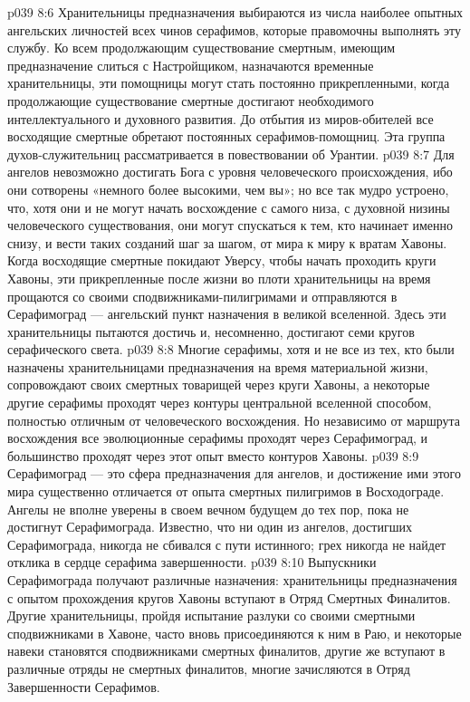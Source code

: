 \vs p039 8:6 Хранительницы предназначения выбираются из числа наиболее опытных ангельских личностей всех чинов серафимов, которые правомочны выполнять эту службу. Ко всем продолжающим существование смертным, имеющим предназначение слиться с Настройщиком, назначаются временные хранительницы, эти помощницы могут стать постоянно прикрепленными, когда продолжающие существование смертные достигают необходимого интеллектуального и духовного развития. До отбытия из миров\hyp{}обителей все восходящие смертные обретают постоянных серафимов\hyp{}помощниц. Эта группа духов\hyp{}служительниц рассматривается в повествовании об Урантии.
\vs p039 8:7 \pc Для ангелов невозможно достигать Бога с уровня человеческого происхождения, ибо они сотворены «немного более высокими, чем вы»; но все так мудро устроено, что, хотя они и не могут начать восхождение с самого низа, с духовной низины человеческого существования, они могут спускаться к тем, кто начинает именно снизу, и вести таких созданий шаг за шагом, от мира к миру к вратам Хавоны. Когда восходящие смертные покидают Уверсу, чтобы начать проходить круги Хавоны, эти прикрепленные после жизни во плоти хранительницы на время прощаются со своими сподвижниками\hyp{}пилигримами и отправляются в Серафимоград --- ангельский пункт назначения в великой вселенной. Здесь эти хранительницы пытаются достичь и, несомненно, достигают семи кругов серафического света.
\vs p039 8:8 Многие серафимы, хотя и не все из тех, кто были назначены хранительницами предназначения на время материальной жизни, сопровождают своих смертных товарищей через круги Хавоны, а некоторые другие серафимы проходят через контуры центральной вселенной способом, полностью отличным от человеческого восхождения. Но независимо от маршрута восхождения все эволюционные серафимы проходят через Серафимоград, и большинство проходят через этот опыт вместо контуров Хавоны.
\vs p039 8:9 \pc Серафимоград --- это сфера предназначения для ангелов, и достижение ими этого мира существенно отличается от опыта смертных пилигримов в Восходограде. Ангелы не вполне уверены в своем вечном будущем до тех пор, пока не достигнут Серафимограда. Известно, что ни один из ангелов, достигших Серафимограда, никогда не сбивался с пути истинного; грех никогда не найдет отклика в сердце серафима завершенности.
\vs p039 8:10 Выпускники Серафимограда получают различные назначения: хранительницы предназначения с опытом прохождения кругов Хавоны вступают в Отряд Смертных Финалитов. Другие хранительницы, пройдя испытание разлуки со своими смертными сподвижниками в Хавоне, часто вновь присоединяются к ним в Раю, и некоторые навеки становятся сподвижниками смертных финалитов, другие же вступают в различные отряды не смертных финалитов, многие зачисляются в Отряд Завершенности Серафимов.
